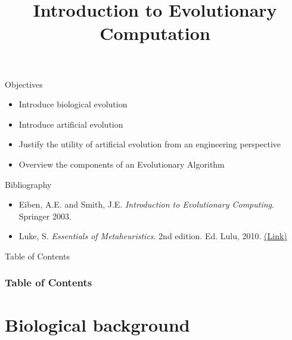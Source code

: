 \documentclass[10pt,compress]{beamer} %
\title[Introduction to Evolutionary Computation]{Introduction to Evolutionary Computation}
\author{}
\institute{\asignatura}
\date{}
\begin{document}
{\titlepageBlue
    \begin{frame}
        \titlepage
    \end{frame}
}

\begin{frame}[plain]{}
   \begin{block}{Objectives}
       \begin{itemize}
        \item Introduce biological evolution
        \item Introduce artificial evolution
		\item Justify the utility of artificial evolution from an engineering perspective
		\item Overview the components of an Evolutionary Algorithm
       \end{itemize}
   \end{block}

   \begin{block}{Bibliography}
   		\begin{itemize}
       \item Eiben, A.E. and Smith, J.E. \emph{Introduction to Evolutionary Computing}. Springer 2003. 
     	\item Luke, S. \emph{Essentials of Metaheuristics}. 2nd edition. Ed. Lulu, 2010. \href{https://cs.gmu.edu/~sean/book/metaheuristics/Essentials.pdf}{(Link)}
   		\end{itemize}
   \end{block}
\end{frame}

{
\eliminarNavegacion
\begin{frame}[shrink]{Table of Contents}
 \frametitle{Table of Contents}
 \tableofcontents
\end{frame}
}

\section{Biological background}
\end{document}
